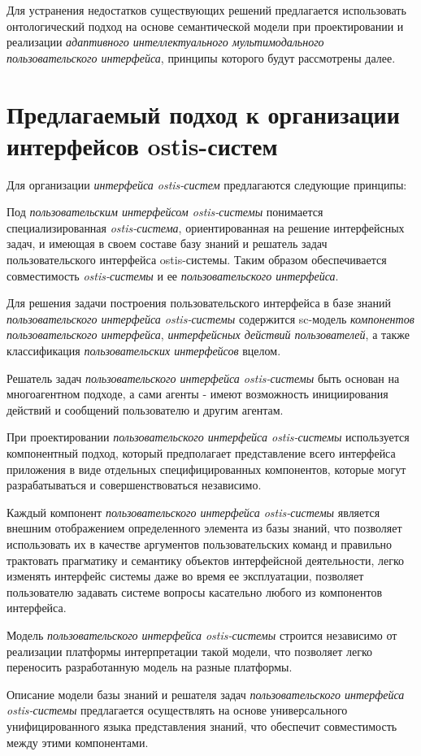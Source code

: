 Для устранения недостатков существующих решений предлагается использовать онтологический подход на основе семантической модели при проектировании и реализации \textit{адаптивного интеллектуального мультимодального пользовательского интерфейса}, принципы которого будут рассмотрены далее.

\section{Предлагаемый подход к организации интерфейсов ostis-систем}
\label{sec_proposed_ui_approach}

Для организации \textit{интерфейса ostis-систем} предлагаются следующие принципы:
\begin{textitemize}
	\item Под \textit{пользовательским интерфейсом ostis-системы} понимается специализированная \textit{ostis-система}, ориентированная на решение интерфейсных задач, и имеющая в своем составе базу знаний и решатель задач пользовательского интерфейса ostis-системы. Таким образом обеспечивается совместимость \textit{ostis-системы} и ее \textit{пользовательского интерфейса}.
	\item Для решения задачи построения пользовательского интерфейса в базе знаний \textit{пользовательского интерфейса ostis-системы} содержится sc-модель \textit{компонентов пользовательского интерфейса}, \textit{интерфейсных действий пользователей}, а также классификация \textit{пользовательских интерфейсов} вцелом.
	\item Решатель задач \textit{пользовательского интерфейса ostis-системы} быть основан на многоагентном подходе, а сами агенты - имеют возможность инициирования действий и сообщений пользователю и другим агентам.
	\item При проектировании \textit{пользовательского интерфейса ostis-системы} используется компонентный подход, который предполагает представление всего интерфейса приложения в виде отдельных специфицированных компонентов, которые могут разрабатываться и совершенствоваться независимо.
	\item Каждый компонент \textit{пользовательского интерфейса ostis-системы} является внешним отображением определенного элемента из базы знаний, что позволяет использовать их в качестве аргументов пользовательских команд и правильно трактовать прагматику и семантику объектов интерфейсной деятельности, легко изменять интерфейс системы даже во время ее эксплуатации, позволяет пользователю задавать системе вопросы касательно любого из компонентов интерфейса.
	\item Модель \textit{пользовательского интерфейса ostis-системы} строится независимо от реализации платформы интерпретации такой модели, что позволяет легко переносить разработанную модель на разные платформы.
	\item Описание модели базы знаний и решателя задач \textit{пользовательского интерфейса ostis-системы} предлагается осуществлять на основе универсального унифицированного языка представления знаний, что обеспечит совместимость между этими компонентами.
\end{textitemize}

